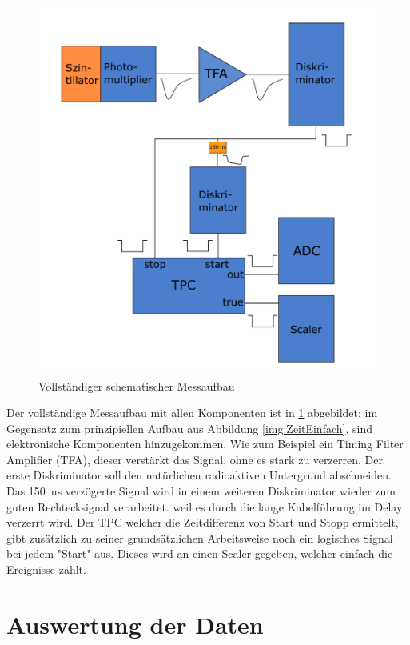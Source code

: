 \documentclass[12pt,a4paper,ngerman]{report}
\begin{document}
	\begin{figure}[ht]
		\centering
		\includegraphics[width=\textwidth]{Bilder/ZeitmessungKomplex.pdf}		
		\caption[schematischer Messaufbau]{Vollständiger schematischer Messaufbau}
		\label{img:ZeitmessungKomplex}
	\end{figure}
	Der vollständige Messaufbau mit allen Komponenten ist in \ref{img:ZeitmessungKomplex} abgebildet; im Gegensatz zum prinzipiellen Aufbau aus Abbildung \ref{img:ZeitEinfach}, sind elektronische Komponenten hinzugekommen. Wie zum Beispiel ein Timing Filter Amplifier (TFA), dieser verstärkt das Signal, ohne es stark zu verzerren. Der erste Diskriminator soll den natürlichen radioaktiven Untergrund abschneiden. Das \SI{150}{\nano \second} verzögerte Signal wird in einem weiteren Diskriminator wieder zum guten Rechtecksignal verarbeitet. weil es durch die lange Kabelführung im Delay verzerrt wird. Der TPC welcher die Zeitdifferenz von Start und Stopp ermittelt, gibt zusätzlich zu seiner grundsätzlichen Arbeitsweise noch ein logisches Signal bei jedem "Start" aus. Dieses wird an einen Scaler gegeben, welcher einfach die Ereignisse zählt.
	
	
	


\chapter{Auswertung der Daten}
\end{document}
